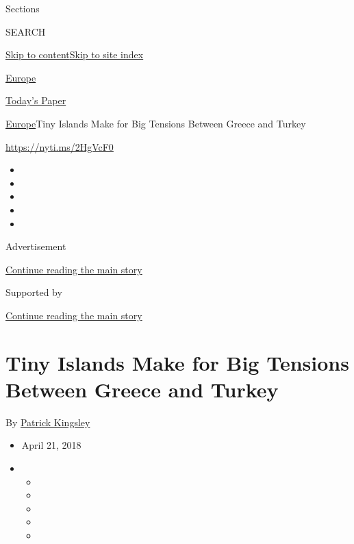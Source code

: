 Sections

SEARCH

\protect\hyperlink{site-content}{Skip to
content}\protect\hyperlink{site-index}{Skip to site index}

\href{https://www.nytimes3xbfgragh.onion/section/world/europe}{Europe}

\href{https://myaccount.nytimes3xbfgragh.onion/auth/login?response_type=cookie\&client_id=vi}{}

\href{https://www.nytimes3xbfgragh.onion/section/todayspaper}{Today's
Paper}

\href{/section/world/europe}{Europe}\textbar{}Tiny Islands Make for Big
Tensions Between Greece and Turkey

\url{https://nyti.ms/2HgVcF0}

\begin{itemize}
\item
\item
\item
\item
\item
\end{itemize}

Advertisement

\protect\hyperlink{after-top}{Continue reading the main story}

Supported by

\protect\hyperlink{after-sponsor}{Continue reading the main story}

\hypertarget{tiny-islands-make-for-big-tensions-between-greece-and-turkey}{%
\section{Tiny Islands Make for Big Tensions Between Greece and
Turkey}\label{tiny-islands-make-for-big-tensions-between-greece-and-turkey}}

By \href{https://www.nytimes3xbfgragh.onion/by/patrick-kingsley}{Patrick
Kingsley}

\begin{itemize}
\item
  April 21, 2018
\item
  \begin{itemize}
  \item
  \item
  \item
  \item
  \item
  \end{itemize}
\end{itemize}

